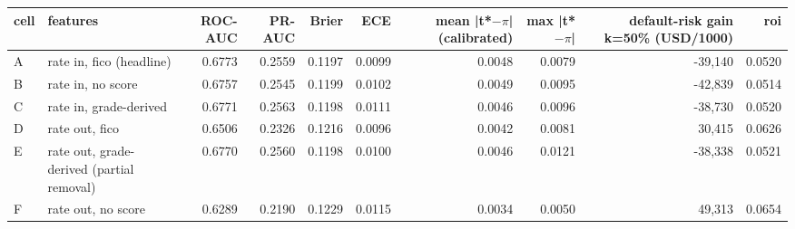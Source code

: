 \begin{tabular}{llrrrrrrrr}
\toprule
cell & features & ROC-AUC & PR-AUC & Brier & ECE & mean |t*$-$$\pi$| (calibrated) & max |t*$-$$\pi$| & default-risk gain k=50\% (USD/1000) & roi \\
\midrule
A & rate in, fico (headline) & 0.6773 & 0.2559 & 0.1197 & 0.0099 & 0.0048 & 0.0079 & -39,140 & 0.0520 \\
B & rate in, no score & 0.6757 & 0.2545 & 0.1199 & 0.0102 & 0.0049 & 0.0095 & -42,839 & 0.0514 \\
C & rate in, grade-derived & 0.6771 & 0.2563 & 0.1198 & 0.0111 & 0.0046 & 0.0096 & -38,730 & 0.0520 \\
D & rate out, fico & 0.6506 & 0.2326 & 0.1216 & 0.0096 & 0.0042 & 0.0081 & 30,415 & 0.0626 \\
E & rate out, grade-derived (partial removal) & 0.6770 & 0.2560 & 0.1198 & 0.0100 & 0.0046 & 0.0121 & -38,338 & 0.0521 \\
F & rate out, no score & 0.6289 & 0.2190 & 0.1229 & 0.0115 & 0.0034 & 0.0050 & 49,313 & 0.0654 \\
\bottomrule
\end{tabular}
